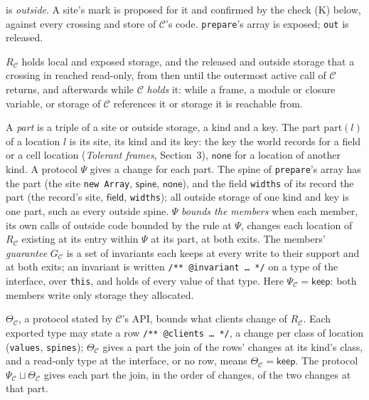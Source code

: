 \documentclass[10pt,a4paper]{article}
\theoremstyle{definition}
\theoremstyle{remark}
\newcommand{\kw}[1]{\mathsf{#1}}
\newcommand{\keep}{\kw{keep}}
\newcommand{\code}[1]{\texttt{#1}}
\newcommand{\kF}{\mathsf{field}}\newcommand{\kC}{\mathsf{cell}}\newcommand{\kE}{\mathsf{elem}}\newcommand{\kS}{\mathsf{spine}}\newcommand{\kI}{\mathsf{id}}
\newcommand{\cC}{\mathcal{C}}
\begin{document}
\begin{description}[leftmargin=1.5em,style=nextline]
is \emph{outside}. A site's mark is proposed for it and confirmed by the
check (K) below, against every crossing and store of $\cC$'s code. \code{prepare}'s array is exposed; \code{out} is
released.
\item[Protected region] $R_\cC$ holds local and exposed storage, and the
released and outside storage that a crossing in reached read-only, from
then until the outermost active call of $\cC$ returns, and afterwards
while $\cC$ \emph{holds} it: while a frame, a module or closure variable,
or storage of $\cC$ references it or storage it is reachable from.
\item[Protocol] A \emph{part} is a triple of a site or outside
storage, a kind and a key. The part $\mathrm{part}(l)$ of a location $l$
is its site, its kind and its key: the key the world records for a field
or a cell location (\emph{Tolerant frames}, Section~3), $\kw{none}$ for
a location of another kind. A protocol $\Psi$ gives a change for each
part. The spine of \code{prepare}'s array has the part (the site
\code{new Array}, $\kS$, $\kw{none}$), and the field \code{widths} of its
record the part (the record's site, $\kF$, \code{widths}); all outside
storage of one kind and key is one part, such as every outside spine. $\Psi$ \emph{bounds the members} when
each member, its own calls of outside code bounded by the rule at
$\Psi$, changes each location of $R_\cC$ existing at its entry within
$\Psi$ at its part, at both exits. The members' \emph{guarantee}
$G_\cC$ is a set of invariants each keeps at every write to their
support and at both exits; an invariant is written \code{/** @invariant
\ldots{} */} on a type of the interface, over \code{this}, and holds of
every value of that type. Here $\Psi_\cC=\keep$: both members write
only storage they allocated.
\item[Client obligation] $\Theta_\cC$, a protocol stated by $\cC$'s API,
bounds what clients change of $R_\cC$. Each exported type may state a
row \code{/** @clients \ldots{} */}, a change per class of location
(\code{values}, \code{spines}); $\Theta_\cC$ gives a part the join of the
rows' changes at its kind's class, and a read-only type at the interface,
or no row, means $\Theta_\cC=\keep$. The protocol
$\Psi_\cC\sqcup\Theta_\cC$ gives each part the join, in the order of
changes, of the two changes at that part.
\end{description}
\end{document}
